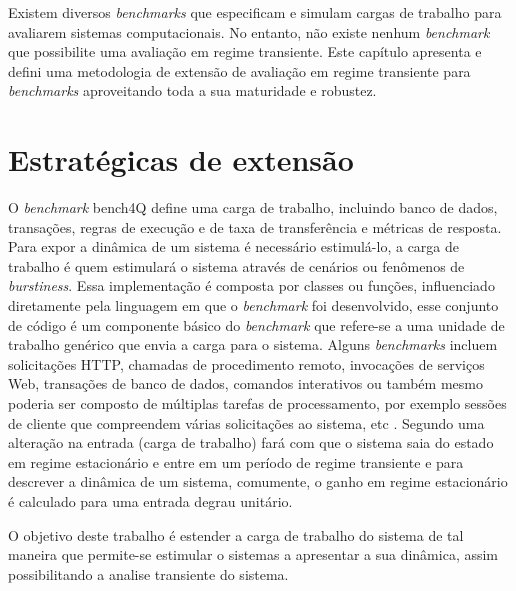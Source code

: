 Existem diversos \textit{benchmarks} que especificam e simulam cargas de trabalho para avaliarem sistemas computacionais. No entanto, não existe nenhum \textit{benchmark} que possibilite uma avaliação em regime transiente. Este capítulo apresenta e defini uma metodologia de extensão de avaliação em regime transiente para \textit{benchmarks} aproveitando toda a sua maturidade e robustez.




\section{Estratégicas de extensão}

O \textit{benchmark} bench4Q define uma carga de trabalho, incluindo banco de dados, transações, regras de execução e de taxa de transferência e métricas de resposta.  Para expor a dinâmica de um sistema é necessário estimulá-lo, a carga de trabalho é quem estimulará o sistema através de cenários ou fenômenos de \textit{burstiness}. Essa implementação é composta por classes ou funções, influenciado diretamente pela linguagem em que o \textit{benchmark} foi desenvolvido, esse conjunto de código é um componente básico do \textit{benchmark} que refere-se a uma unidade de trabalho genérico que envia a carga para o sistema. Alguns \textit{benchmarks} incluem solicitações HTTP, chamadas de procedimento remoto, invocações de serviços Web, transações de banco de dados, comandos interativos ou também mesmo poderia ser composto de múltiplas tarefas de processamento, por exemplo sessões de cliente que compreendem várias solicitações ao sistema, etc \cite{Kounev2005}. Segundo \cite{Nobile2013} uma alteração na entrada (carga de trabalho) fará com que o sistema saia do estado em regime estacionário e entre em um período de regime transiente e para descrever a dinâmica de um sistema, comumente, o ganho em regime estacionário é calculado para uma entrada degrau unitário.

O objetivo deste trabalho é estender a carga de trabalho do sistema de tal maneira que permite-se estimular o sistemas a apresentar a sua dinâmica, assim possibilitando a analise transiente do sistema.


